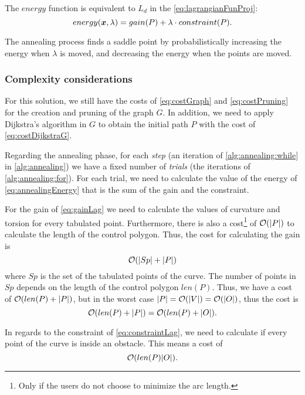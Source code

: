\documentclass[dissertation.tex]{subfiles}
\begin{document}
The $energy$ function is equivalent to $L_d$ in the
\cref{eq:lagrangianFunProj}:
\begin{equation}
  \label{eq:annealingEnergy}
  energy(\boldsymbol{x},\lambda)=gain(P)+\lambda\cdot constraint(P).
\end{equation}

The annealing process
finds a saddle point by probabilistically increasing the energy when
$\lambda$ is moved, and 
decreasing the energy when the points are moved.

\subsubsection{Complexity considerations}
For this solution, we still have the costs of \cref{eq:costGraph} and
\cref{eq:costPruning} for
the creation and pruning of the graph $G$. In addition, we need to
apply Dijkstra's
algorithm in $G$ to obtain the initial path $P$ with the cost of
\cref{eq:costDijkstraG}.

Regarding the annealing phase, for each \emph{step} (an
iteration of \cref{alg:annealing:while} in \cref{alg:annealing}) we
have a fixed number of \emph{trials} (the iterations of \cref{alg:annealing:for}). For each trial, we need to
calculate the value of the energy of \cref{eq:annealingEnergy} that is
the sum of the gain and the constraint.

For the gain of \cref{eq:gainLag} we need to calculate the values of
curvature and torsion for every tabulated point. Furthermore, there is
also a cost\footnote{Only if
  the users do not choose to minimize the arc length.} of
$\mathcal{O}(|P|)$ to
calculate the length of the control polygon. Thus, the cost for
calculating the gain is
\begin{equation*}
  \mathcal{O}(|Sp|+|P|)
\end{equation*}
where $Sp$ is the set of the tabulated points of the curve. The number
of points in $Sp$ depends on the length of the control polygon
$len(P)$. Thus,
we have a cost of $\mathcal{O}(len(P)+|P|)$, but in the worst case
$|P|=\mathcal{O}(|V|)=\mathcal{O}(|O|)$, thus the cost is
\newcommand{\eqCostGain}{\ensuremath{\bigO(len(P)+|P|)=\bigO(len(P)+|\obsSet|)}}
\begin{equation}
  \label{eq:costGain}
  \eqCostGain.
\end{equation}

In regards to the constraint of \cref{eq:constraintLag}, we need to
calculate if 
every point 
of the curve is inside an obstacle. This means a cost of
\newcommand{\eqCostConstraint}{\ensuremath{\bigO(len(P)|\obsSet|)}}
\begin{equation}
  \label{eq:costConstraint}
  \eqCostConstraint.
\end{equation}
\end{document}
